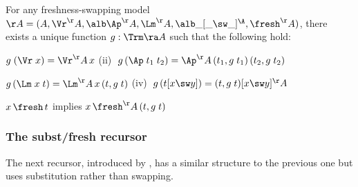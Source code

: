 \begin{thm} \rm \cite%
		{DBLP:journals/jar/GheriP20} %
	\label{thm-popRecSwap}
	For any  freshness-swapping model $\AA = (A,\Vr^\AA,\alb\Ap^\AA,\Lm^\AA,\alb\_[\_\sw\_]^\A,\fresh^\AA)$, there exists a unique function $g : \Trm \ra A$  %
	such that the following hold: %
	\begin{myitem}
		\item[(i)] $g\;(\Vr\;x) = \Vr^\AA\,x$
		\hspace*{12.5ex} (ii) 
		$\;g\,(\Ap\;t_1\;t_2)  = \Ap^\AA\,(t_1,g\;t_1)\,(t_2,g\;t_2)$
		\item[(iii)]   $g\,(\Lm\;x\;t) = \Lm^\AA\,x\,(t,g\;t)$ 
		\hspace*{2.3ex}
		 (iv) $\;g\,(t[x \sw y]) = (t,g\;t) [x \sw y]^\AA$ 
		 \item[(v)] $x \,\fresh\, t$ implies $x \,\fresh^\AA\, (t,g\;t)$ %
	\end{myitem}
\end{thm} 


\subsubsection{The subst/fresh recursor} 
\label{subsubsec-freshSubstRec}
%
The next recursor, introduced by %
 \citet{DBLP:conf/icfp/PopescuG11},  %
has a similar structure to the previous one 
but uses substitution rather than swapping. %

